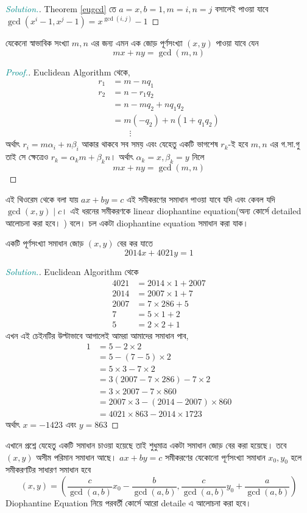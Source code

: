 \documentclass[a4paper,11pt]{article}
\newenvironment{sltn}{\begin{proof}[\emph{\textcolor{darkcyan}{Solution.}}]} {\end{proof}}
\newenvironment{prf}{\begin{proof}[\emph{\textcolor{darkcyan}{Proof.}}]} {\end{proof}}
\begin{document}
\begin{sltn}
	Theorem \ref{eugcd} তে $a=x, b=1, m=i, n=j$ বসালেই পাওয়া যাবে $\gcd(x^i-1,x^j-1)=x^{\gcd(i,j)}-1$
\end{sltn}
\begin{thrm}
	যেকেনো স্বাভাবিক সংখ্যা $m,n$ এর জন্য এমন এক জোড় পূর্ণসংখ্যা $(x,y)$ পাওয়া যাবে যেন  
	\[mx+ny=\gcd(m,n)\]
\end{thrm}
\begin{prf}
	Euclidean Algorithm থেকে, 
	\begin{align*}
		r_1 & =m-nq_1              \\
		r_2 & =n-r_1q_2            \\
		    & =n-mq_2+nq_1q_2      \\
		    & =m(-q_2)+n(1+q_1q_2) \\
		    & \qquad \vdots
	\end{align*}
	অর্থাৎ $r_i=m\alpha_i+n\beta_i$ আকার থাকবে সব সময় এবং যেহেতু একটি ভাগশেষ $r_k$-ই হবে $m,n$ এর গ.সা.গু তাই সে ক্ষেত্রেও $r_k=\alpha_km+\beta_kn$। অর্থাৎ $\alpha_k=x, \beta_k=y$ নিলে \[mx+ny=\gcd(m,n)\]
\end{prf}
এই থিওরেম থেকে বলা যায় $ax+by=c$ এই সমীকরণের সমাধান পাওয়া যাবে যদি এবং কেবল যদি $\gcd(x,y) \mid c$। এই ধরনের সমীকরণকে linear diophantine equation(অন্য কোর্সে detailed আলোচনা করা হবে। ) বলে। চল একটা diophantine equation সমাধান করা যাক। 
\begin{xmpl}
	একটি পূর্ণসংখ্যা সমাধান জোড় $(x,y)$ বের কর যাতে
	\[2014x+4021y=1\]
\end{xmpl}
\begin{sltn}
	Euclidean Algorithm থেকে 
	\begin{align*}
		4021 & =2014\times 1+2007 \\
		2014 & =2007\times 1 +7   \\
		2007 & =7\times 286 +5    \\
		7    & =5\times 1 +2      \\
		5    & =2\times 2+1
	\end{align*}
	এখন এই চেইনটির উল্টাভাবে আগালেই আমরা আমাদের সমাধান পাব, 
	\begin{align*}
		1 & =5-2\times 2                        \\
		  & =5-(7-5)\times 2                    \\
		  & =5\times 3-7\times 2                \\
		  & =3(2007-7\times 286)-7\times 2      \\
		  & =3\times 2007-7\times 860           \\
		  & =2007\times 3-(2014-2007)\times 860 \\
		  & =4021\times 863-2014\times 1723
	\end{align*}
	অর্থাৎ $x=-1423$ এবং $y=863$
\end{sltn}
এখানে প্রশ্নে যেহেতু একটি সমাধান চাওয়া হয়েছে তাই শুধুমাত্র একটা সমাধান জোড় বের করা হয়েছে। তবে $(x,y)$ অসীম পরিমান সমাধান আছে। $ax+by=c$ সমীকরণের যেকোনো পূর্ণসংখ্যা সমাধান $x_0,y_0$ হলে সমীকরণটির সাধারণ সমাধান হবে 
\[(x,y)=\left(\dfrac{c}{\gcd(a,b)}x_0-\dfrac{b}{\gcd(a,b)}, \dfrac{c}{\gcd(a,b)}y_0+\dfrac{a}{\gcd(a,b)}\right)\]
Diophantine Equation নিয়ে পরবর্তী কোর্সে আরো detaile এ আলোচনা করা হবে। 
\end{document}
